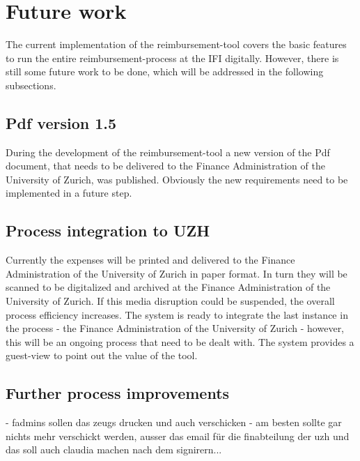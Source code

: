 \section{Future work}
\label{sec:future-work}

The current implementation of the reimbursement-tool covers the basic features to run the entire reimbursement-process at the IFI digitally. However, there is still some future work to be done, which will be addressed in the following subsections. 

\subsection{Pdf version 1.5}
During the development of the reimbursement-tool a new version of the Pdf document, that needs to be delivered to the Finance Administration of the University of Zurich, was published. Obviously the new requirements need to be implemented in a future step.

\subsection{Process integration to UZH}
Currently the expenses will be printed and delivered to the Finance Administration of the University of Zurich in paper format. In turn they will be scanned to be digitalized and archived at the Finance Administration of the University of Zurich. If this media disruption could be suspended, the overall process efficiency increases. The system is ready to integrate the last instance in the process - the Finance Administration of the University of Zurich - however, this will be an ongoing process that need to be dealt with. The system provides a guest-view to point out the value of the tool.


\subsection{Further process improvements}
- fadmins sollen das zeugs drucken und auch verschicken
- am besten sollte gar nichts mehr verschickt werden, ausser das email für die finabteilung der uzh und das soll auch claudia machen nach dem signirern...